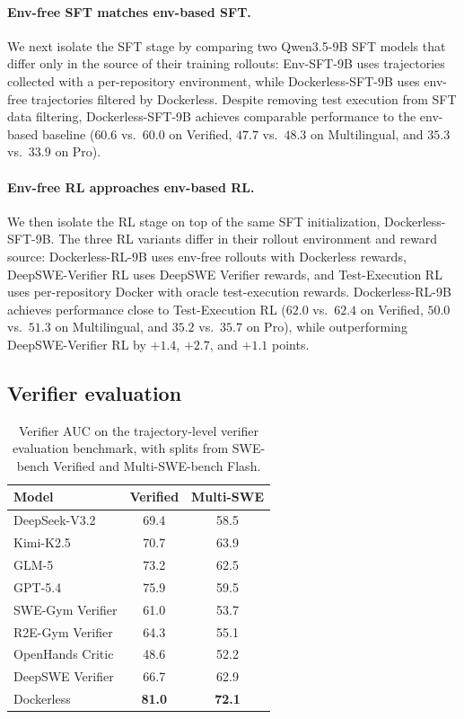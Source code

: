 \documentclass[]{arxiv_template}
\newcommand{\approach}{Dockerless\xspace}
\begin{document}
\paragraph{Env-free SFT matches env-based SFT.}
We next isolate the SFT stage by comparing two Qwen3.5-9B SFT models that differ only in the source of their training rollouts: Env-SFT-9B uses trajectories collected with a per-repository environment, while \approach-SFT-9B uses env-free trajectories filtered by \approach.
Despite removing test execution from SFT data filtering, \approach-SFT-9B achieves comparable performance to the env-based baseline ($60.6$ vs.\ $60.0$ on Verified, $47.7$ vs.\ $48.3$ on Multilingual, and $35.3$ vs.\ $33.9$ on Pro).

\paragraph{Env-free RL approaches env-based RL.}
We then isolate the RL stage on top of the same SFT initialization, \approach-SFT-9B.
The three RL variants differ in their rollout environment and reward source: \approach-RL-9B uses env-free rollouts with \approach rewards, DeepSWE-Verifier RL uses DeepSWE Verifier rewards, and Test-Execution RL uses per-repository Docker with oracle test-execution rewards.
\approach-RL-9B achieves performance close to Test-Execution RL ($62.0$ vs.\ $62.4$ on Verified, $50.0$ vs.\ $51.3$ on Multilingual, and $35.2$ vs.\ $35.7$ on Pro), while outperforming DeepSWE-Verifier RL by $+1.4$, $+2.7$, and $+1.1$ points.

\subsection{Verifier evaluation}
\label{sec:verifier-eval}
\begin{table}[t]
\centering
\small
\begin{tabular}{lcc}
\toprule
\textbf{Model}
& \textbf{Verified}
& \textbf{Multi-SWE} \\
\midrule
DeepSeek-V3.2          & 69.4 & 58.5 \\
Kimi-K2.5              & 70.7 & 63.9 \\
GLM-5                  & 73.2 & 62.5 \\
GPT-5.4                & 75.9 & 59.5 \\
\midrule
SWE-Gym Verifier       & 61.0 & 53.7 \\
R2E-Gym Verifier       & 64.3 & 55.1 \\
OpenHands Critic       & 48.6 & 52.2 \\
DeepSWE Verifier       & 66.7 & 62.9 \\
\midrule
\rowcolor{black!4}
\approach              & \textbf{81.0} & \textbf{72.1} \\
\bottomrule
\end{tabular}
\caption{
Verifier AUC on the trajectory-level verifier evaluation benchmark, with splits from SWE-bench Verified and Multi-SWE-bench Flash.
}
\label{tab:rm-bench}
\end{table}
\end{document}
